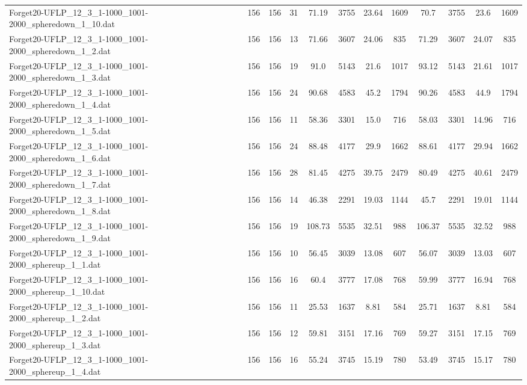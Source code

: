 \begin{sidewaystable}[!ht]
{\begin{tabular}{lccccccccccc}
Forget20-UFLP\_12\_3\_1-1000\_1001-2000\_spheredown\_1\_10.dat & 156 & 156 & 31 & 71.19 & 3755 & 23.64 & 1609 & 70.7 & 3755 & 23.6 & 1609 \\
Forget20-UFLP\_12\_3\_1-1000\_1001-2000\_spheredown\_1\_2.dat & 156 & 156 & 13 & 71.66 & 3607 & 24.06 & 835 & 71.29 & 3607 & 24.07 & 835 \\
Forget20-UFLP\_12\_3\_1-1000\_1001-2000\_spheredown\_1\_3.dat & 156 & 156 & 19 & 91.0 & 5143 & 21.6 & 1017 & 93.12 & 5143 & 21.61 & 1017 \\
Forget20-UFLP\_12\_3\_1-1000\_1001-2000\_spheredown\_1\_4.dat & 156 & 156 & 24 & 90.68 & 4583 & 45.2 & 1794 & 90.26 & 4583 &  \textcolor{blue2}{44.9} & 1794 \\
Forget20-UFLP\_12\_3\_1-1000\_1001-2000\_spheredown\_1\_5.dat & 156 & 156 & 11 & 58.36 & 3301 & 15.0 & 716 & 58.03 & 3301 &  \textcolor{blue2}{14.96} & 716 \\
Forget20-UFLP\_12\_3\_1-1000\_1001-2000\_spheredown\_1\_6.dat & 156 & 156 & 24 & 88.48 & 4177 & 29.9 & 1662 & 88.61 & 4177 & 29.94 & 1662 \\
Forget20-UFLP\_12\_3\_1-1000\_1001-2000\_spheredown\_1\_7.dat & 156 & 156 & 28 & 81.45 & 4275 &  \textcolor{blue2}{39.75} & 2479 & 80.49 & 4275 & 40.61 & 2479 \\
Forget20-UFLP\_12\_3\_1-1000\_1001-2000\_spheredown\_1\_8.dat & 156 & 156 & 14 & 46.38 & 2291 & 19.03 & 1144 & 45.7 & 2291 & 19.01 & 1144 \\
Forget20-UFLP\_12\_3\_1-1000\_1001-2000\_spheredown\_1\_9.dat & 156 & 156 & 19 & 108.73 & 5535 & 32.51 & 988 & 106.37 & 5535 & 32.52 & 988 \\
Forget20-UFLP\_12\_3\_1-1000\_1001-2000\_sphereup\_1\_1.dat & 156 & 156 & 10 & 56.45 & 3039 & 13.08 & 607 & 56.07 & 3039 & 13.03 & 607 \\
Forget20-UFLP\_12\_3\_1-1000\_1001-2000\_sphereup\_1\_10.dat & 156 & 156 & 16 & 60.4 & 3777 & 17.08 & 768 & 59.99 & 3777 &  \textcolor{blue2}{16.94} & 768 \\
Forget20-UFLP\_12\_3\_1-1000\_1001-2000\_sphereup\_1\_2.dat & 156 & 156 & 11 & 25.53 & 1637 & 8.81 & 584 & 25.71 & 1637 & 8.81 & 584 \\
Forget20-UFLP\_12\_3\_1-1000\_1001-2000\_sphereup\_1\_3.dat & 156 & 156 & 12 & 59.81 & 3151 & 17.16 & 769 & 59.27 & 3151 &  \textcolor{blue2}{17.15} & 769 \\
Forget20-UFLP\_12\_3\_1-1000\_1001-2000\_sphereup\_1\_4.dat & 156 & 156 & 16 & 55.24 & 3745 & 15.19 & 780 & 53.49 & 3745 &  \textcolor{blue2}{15.17} & 780 \\

\end{tabular}}
\end{sidewaystable}
